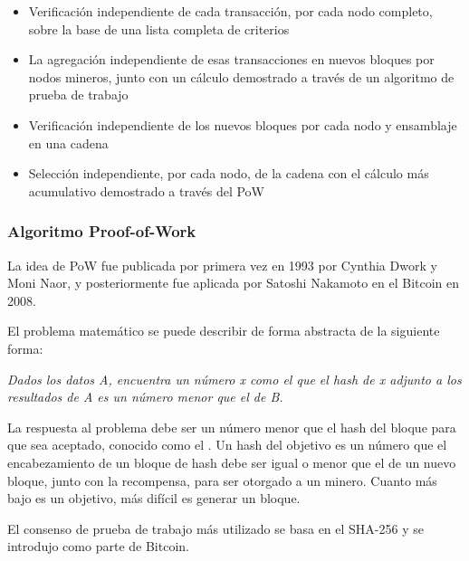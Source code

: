 \begin{itemize}
    \item Verificación independiente de cada transacción, por cada nodo completo, sobre la base de una lista completa 
    de criterios
    \item La agregación independiente de esas transacciones en nuevos bloques por nodos mineros, junto con un cálculo 
    demostrado a través de un algoritmo de prueba de trabajo
    \item Verificación independiente de los nuevos bloques por cada nodo y ensamblaje en una cadena
    \item Selección independiente, por cada nodo, de la cadena con el cálculo más acumulativo demostrado a través del 
    PoW
\end{itemize}

\subsubsection*{Algoritmo Proof-of-Work}

La idea de PoW fue publicada por primera vez en 1993 por Cynthia Dwork y Moni Naor, y posteriormente fue 
aplicada por Satoshi Nakamoto en el Bitcoin en 2008. 

\vspace{5mm}

\noindent El problema matemático se puede describir de forma abstracta de la siguiente forma: 

\vspace{5mm}

\noindent \textit{Dados los datos A, encuentra un número x como el que el hash de x adjunto a los resultados de A es un 
número menor que el de B.}

\vspace{5mm}

\noindent La respuesta al problema debe ser un número menor que el hash del bloque para que sea aceptado, conocido como 
el . Un hash del objetivo es un número que el encabezamiento de un bloque de hash debe ser igual 
o menor que el de un nuevo bloque, junto con la recompensa, para ser otorgado a un minero. Cuanto más bajo es un 
objetivo, más difícil es generar un bloque.

\vspace{5mm}

\noindent El consenso de prueba de trabajo más utilizado se basa en el SHA-256 y se introdujo como parte de Bitcoin.

\vspace{5mm}

